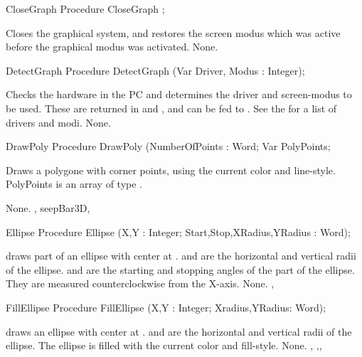 \begin{procedure}{CloseGraph}
\Declaration
Procedure CloseGraph ;

\Description
Closes the graphical system, and restores the
screen modus which was active before the graphical modus was
activated.
\Errors
None.
\SeeAlso
{}
\end{procedure}
\begin{procedure}{DetectGraph}
\Declaration
Procedure DetectGraph (Var Driver, Modus : Integer);

\Description
 Checks the hardware in the PC and determines the driver and screen-modus to
be used. These are returned in  and , and can be fed
to . 
See the  for a list of drivers and modi.
\Errors
None.
\SeeAlso
{}
\end{procedure}
\begin{procedure}{DrawPoly}
\Declaration
Procedure DrawPoly (NumberOfPoints : Word; Var PolyPoints;

\Description

Draws a polygone with  corner points, using the
current color and line-style. PolyPoints is an array of type .

\Errors
None.
\SeeAlso
{}, seep{Bar3D}, 
\end{procedure}
\begin{procedure}{Ellipse}
\Declaration
Procedure Ellipse (X,Y : Integer; Start,Stop,XRadius,YRadius : Word);

\Description
  draws part of an ellipse with center at .
 and  are the horizontal and vertical radii of the
ellipse.  and  are the starting and stopping angles of
the part of the ellipse. 
They are measured counterclockwise from the X-axis.
\Errors
None.
\SeeAlso
{} , 
\end{procedure}
\begin{procedure}{FillEllipse}
\Declaration
Procedure FillEllipse (X,Y : Integer; Xradius,YRadius: Word);

\Description
  draws an ellipse with center at .
 and  are the horizontal and vertical radii of the
ellipse. The ellipse is filled with the current color and fill-style.
\Errors
None.
\SeeAlso
{} ,
,, 
\end{procedure}
